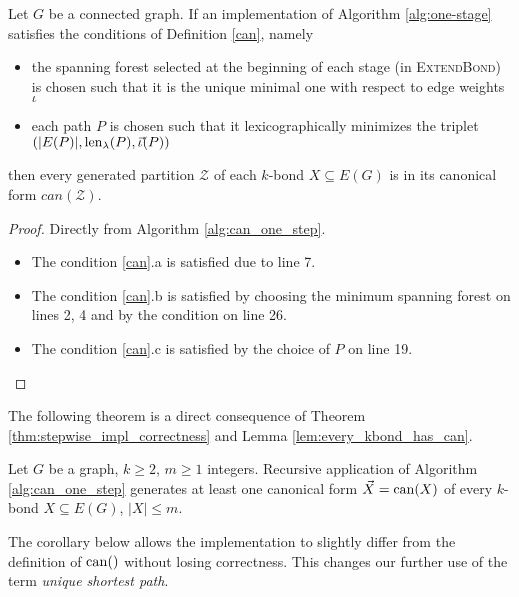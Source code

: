 \begin{lem}
	\label{lem:alg_is_canonical}
	Let $G$ be a connected graph. If an implementation of Algorithm \ref{alg:one-stage} satisfies the conditions of Definition \ref{can}, namely

	\begin{itemize}
		\item the spanning forest selected at the beginning of each stage (in \textsc{ExtendBond}) is chosen such that it is the unique minimal one with respect to edge weights $\iota$
		\item each path $P$ is chosen such that it lexicographically minimizes the triplet $(\lvert E(P) \rvert, \operatorname{len}_\lambda(P), \vec{\iota}(P) )$
	\end{itemize}

	then every generated partition $\mathcal{Z}$ of each $k$-bond $X \subseteq E(G)$ is in its canonical form $can(\mathcal{Z})$.
\end{lem}

\begin{proof}
	Directly from Algorithm \ref{alg:can_one_step}.
	\begin{itemize}
		\item The condition \ref{can}.a is satisfied due to line 7.
		\item The condition \ref{can}.b is satisfied by choosing the minimum spanning forest on lines 2, 4 and by the condition on line 26.
		\item The condition \ref{can}.c is satisfied by the choice of $P$ on line 19.
	\end{itemize}
\end{proof}

\noindent The following theorem is a direct consequence of Theorem \ref{thm:stepwise_impl_correctness} and Lemma \ref{lem:every_kbond_has_can}.


\begin{thm}
	Let $G$ be a graph, $k \geq 2$, $m \geq 1$ integers. Recursive application of Algorithm \ref{alg:can_one_step} generates at least one canonical form $\vec X = \operatorname{can}(X)$ of every $k$-bond $X \subseteq E(G)$, $\lvert X \rvert \leq m$.
\end{thm}

The corollary below allows the implementation to slightly differ from the definition of $\operatorname{can}()$ without losing correctness. This changes our further use of the term \textit{unique shortest path}.

